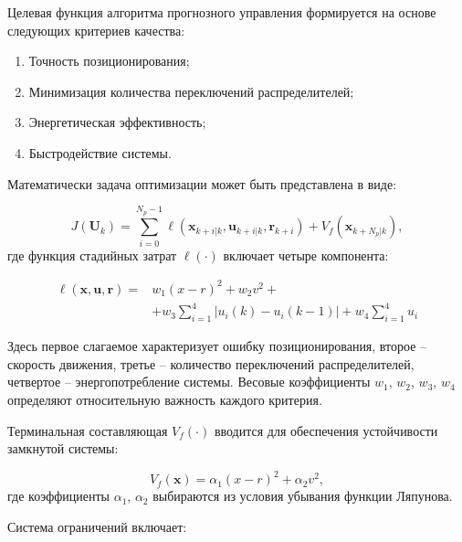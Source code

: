 Целевая функция алгоритма прогнозного управления формируется на основе следующих критериев качества:

\begin{enumerate}
	\item Точность позиционирования;
	\item Минимизация количества переключений распределителей;
	\item Энергетическая эффективность;
	\item Быстродействие системы.
\end{enumerate}

Математически задача оптимизации может быть представлена в виде:

\begin{equation}
	J(\mathbf{U}_k) = \sum_{i=0}^{N_p-1} \ell(\mathbf{x}_{k+i|k}, \mathbf{u}_{k+i|k}, \mathbf{r}_{k+i}) + V_f(\mathbf{x}_{k+N_p|k}),
\end{equation}
где функция стадийных затрат $\ell(\cdot)$ включает четыре компонента:

\begin{equation}
	\begin{aligned}
		\ell(\mathbf{x}, \mathbf{u}, \mathbf{r}) = & w_1(x - r)^2 + w_2v^2 +                                    \\
		                                           & + w_3\sum_{i=1}^4|u_i(k) - u_i(k-1)| + w_4\sum_{i=1}^4 u_i
	\end{aligned}
\end{equation}

Здесь первое слагаемое характеризует ошибку позиционирования, второе -- скорость движения, третье -- количество переключений распределителей,
четвертое -- энергопотребление системы. Весовые коэффициенты $w_1$, $w_2$, $w_3$, $w_4$ определяют относительную важность каждого критерия.

Терминальная составляющая $V_f(\cdot)$ вводится для обеспечения устойчивости замкнутой системы:

\begin{equation}
	V_f(\mathbf{x}) = \alpha_1(x - r)^2 + \alpha_2v^2,
\end{equation}
где коэффициенты $\alpha_1$, $\alpha_2$ выбираются из условия убывания функции Ляпунова.

Система ограничений включает:

